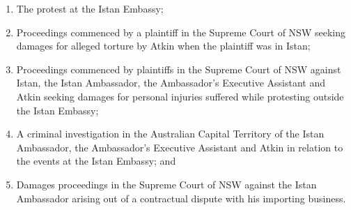 \begin{tutorialquestion}
    \begin{enumerate}
        \item The protest at the Istan Embassy;
        \item Proceedings commenced by a plaintiff in the Supreme Court of NSW seeking damages for alleged torture by Atkin when the plaintiff was in Istan;
        \item Proceedings commenced by plaintiffs in the Supreme Court of NSW against Istan, the Istan Ambassador, the Ambassador’s Executive Assistant and Atkin seeking damages for personal injuries suffered while protesting outside the Istan Embassy;
        \item A criminal investigation in the Australian Capital Territory of the Istan Ambassador, the Ambassador's Executive Assistant and Atkin in relation to the events at the Istan Embassy; and
        \item Damages proceedings in the Supreme Court of NSW against the Istan Ambassador arising out of a contractual dispute with his importing business.
    \end{enumerate}
\end{tutorialquestion}

